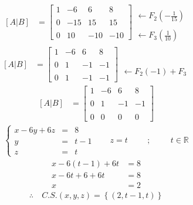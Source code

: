 \documentclass[10pt, a4paper]{article}
\begin{document}
  \begin{align*}
    \left[A|B\right]&=\left[
      \begin{array}{ccc|c}
        1 & -6 & 6 & 8 \\\\
        0 & -15 & 15 & 15 \\\\
        0 & 10 & -10 & -10
      \end{array}
    \right]
    \begin{array}{r}
      \\\\
      \leftarrow F_2\left(-\frac{1}{15}\right)
      \\\\
      \leftarrow F_3\left(\frac{1}{10}\right)
    \end{array}
  \end{align*}
  \begin{align*}
    \left[A|B\right]&=\left[
      \begin{array}{ccc|c}
        1 & -6 & 6 & 8 \\\\
        0 & 1 & -1 & -1 \\\\
        0 & 1 & -1 & -1
      \end{array}
    \right]
    \begin{array}{r}
      \\\\
      \\\\
      \leftarrow F_2\left(-1\right)+F_3
    \end{array}
  \end{align*}
  \begin{align*}
    \left[A|B\right]&=\left[
      \begin{array}{ccc|c}
        1 & -6 & 6 & 8 \\\\
        0 & 1 & -1 & -1 \\\\
        0 & 0 & 0 & 0
      \end{array}
    \right]
  \end{align*}
  \begin{align*}
    \left\{
    \begin{array}{rcl}
      x-6y+6z &= &8\\
      y &= &t-1\\
      z &= &t
    \end{array}
    \right.\ &&z=t\hspace{1cm};\hspace{1cm}t\in\mathbb{R}
    \end{align*}
    \begin{align*}
      x-6\left(t-1\right)+6t &= 8\\
      x-6t+6+6t &= 8\\
      x &= 2
    \end{align*}
    \begin{align*}
      \therefore \ &C.S. \left(x,y,z\right) = \left\{\left(2,t-1,t\right)\right\}
    \end{align*}
\newpage
\end{document}
